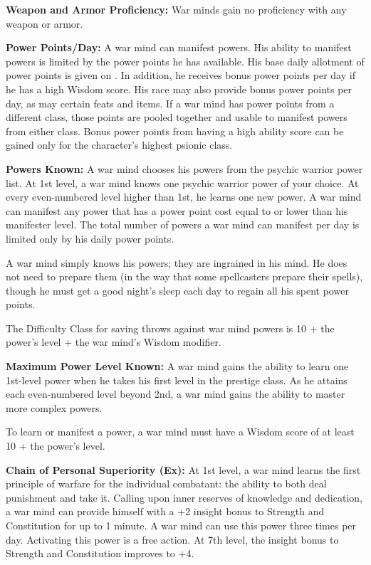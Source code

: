 {
\textbf{Weapon and Armor Proficiency:} War minds gain no proficiency with any weapon or armor.

\textbf{Power Points/Day:} A war mind can manifest powers. His ability to manifest powers is limited by the power points he has available. His base daily allotment of power points is given on . In addition, he receives bonus power points per day if he has a high Wisdom score. His race may also provide bonus power points per day, as may certain feats and items. If a war mind has power points from a different class, those points are pooled together and usable to manifest powers from either class. Bonus power points from having a high ability score can be gained only for the character's highest psionic class.

\textbf{Powers Known:} A war mind chooses his powers from the psychic warrior power list. At 1st level, a war mind knows one psychic warrior power of your choice. At every even-numbered level higher than 1st, he learns one new power. A war mind can manifest any power that has a power point cost equal to or lower than his manifester level. The total number of powers a war mind can manifest per day is limited only by his daily power points.

A war mind simply knows his powers; they are ingrained in his mind. He does not need to prepare them (in the way that some spellcasters prepare their spells), though he must get a good night's sleep each day to regain all his spent power points.

The Difficulty Class for saving throws against war mind powers is 10 + the power's level + the war mind's Wisdom modifier.

\textbf{Maximum Power Level Known:} A war mind gains the ability to learn one 1st-level power when he takes his first level in the prestige class. As he attains each even-numbered level beyond 2nd, a war mind gains the ability to master more complex powers.

To learn or manifest a power, a war mind must have a Wisdom score of at least 10 + the power's level.

\textbf{Chain of Personal Superiority (Ex):} At 1st level, a war mind learns the first principle of warfare for the individual combatant: the ability to both deal punishment and take it. Calling upon inner reserves of knowledge and dedication, a war mind can provide himself with a +2 insight bonus to Strength and Constitution for up to 1 minute. A war mind can use this power three times per day. Activating this power is a free action. At 7th level, the insight bonus to Strength and Constitution improves to +4.

}
